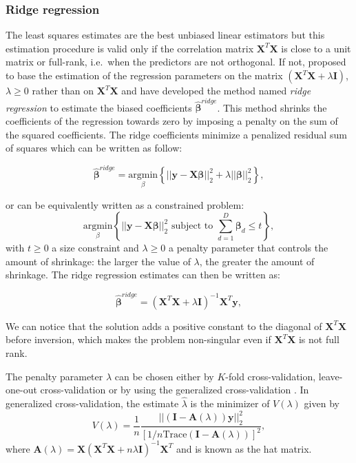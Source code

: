 \documentclass[]{book}
\begin{document}
\hypertarget{ridge-regression}{%
\subsubsection*{Ridge regression}\label{ridge-regression}}

The least squares estimates are the best unbiased linear estimators but
this estimation procedure is valid only if the correlation matrix
\(\mathbf{X}^T\mathbf{X}\) is close to a unit matrix or full-rank, i.e.~when the
predictors are not orthogonal. If not, \citep{hoerl1970ridge} proposed to
base the estimation of the regression parameters on the matrix
\((\mathbf{X}^T\mathbf{X} + \lambda\mathbf{I})\), \(\lambda \geq 0\) rather than on \(\mathbf{X}^T\mathbf{X}\)
and have developed the method named \emph{ridge regression} to estimate the
biased coefficients \(\hat{\boldsymbol{\beta}}^{ridge}\). This method shrinks the
coefficients of the regression towards zero by imposing a penalty on the
sum of the squared coefficients. The ridge coefficients minimize a
penalized residual sum of squares which can be written as follow:

\[\hat{\boldsymbol{\beta}}^{ridge} = \underset{\beta}{\text{argmin}} \left\lbrace || \mathbf{y} - \mathbf{X}\boldsymbol{\beta} ||_2^2 + \lambda ||\boldsymbol{\beta}||_2^2 \right\rbrace, 
\label{eq:ridge}\]

or can be equivalently written as a constrained problem:
\[\underset{\beta}{\text{argmin}} \left\lbrace || \mathbf{y} - \mathbf{X}\boldsymbol{\beta} ||_2^2 \text{ subject to } \sum_{d=1}^D \boldsymbol{\beta}_d \leq t \right\rbrace,\]
with \(t \geqslant 0\) a size constraint and \(\lambda \geqslant 0\) a
penalty parameter that controls the amount of shrinkage: the larger the
value of \(\lambda\), the greater the amount of shrinkage. The ridge
regression estimates can then be written as:

\[\boldsymbol{\hat{\boldsymbol{\beta}}}^{ridge} = (\mathbf{X}^T\mathbf{X} + \lambda \mathbf{I})^{-1} \mathbf{X}^T \mathbf{y},
\label{eq:ridgesol}\]

We can notice that the solution adds a positive constant to the diagonal
of \(\mathbf{X}^T\mathbf{X}\) before inversion, which makes the problem non-singular
even if \(\mathbf{X}^T\mathbf{X}\) is not full rank.

The penalty parameter \(\lambda\) can be chosen either by \(K\)-fold
cross-validation, leave-one-out cross-validation or by using the
generalized cross-validation \citep{golub1979generalized}. In generalized
cross-validation, the estimate \(\hat{\lambda}\) is the minimizer of
\(V(\lambda)\) given by
\[V(\lambda) = \frac{1}{n} \frac{||(\mathbf{I} - \mathbf{A}(\lambda))\mathbf{y} ||_2^2}{\left[ 1/n \text{Trace}(\mathbf{I} - \mathbf{A}(\lambda))\right]^2},\]
where \(\mathbf{A}(\lambda) = \mathbf{X}(\mathbf{X}^T\mathbf{X} + n\lambda\mathbf{I})^{-1}\mathbf{X}^T\) and is
known as the hat matrix.
\end{document}
